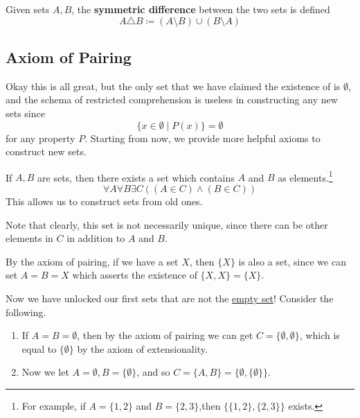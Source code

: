   \begin{definition}
    \label{def:symmetric-difference}
    Given sets $A, B$, the \textbf{symmetric difference} between the two sets is defined 
    \begin{equation}
      A \triangle B \coloneqq (A \setminus B) \cup (B \setminus A)
    \end{equation}
  \end{definition} 

\subsection{Axiom of Pairing}

  Okay this is all great, but the only set that we have claimed the existence of is $\emptyset$, and the schema of restricted comprehension is useless in constructing any new sets since 
  \begin{equation}
    \{x \in \emptyset \mid P(x) \} = \emptyset
  \end{equation}
  for any property $P$. Starting from now, we provide more helpful axioms to construct new sets. 

  \begin{axiom}
    \label{thm:axiom-of-pairing}
    If $A, B$ are sets, then there exists a set which contains $A$ and $B$ as elements.\footnote{For example, if $A = \{1, 2\}$ and $B = \{2, 3\}$,then $\{\{1, 2\}, \{2, 3\}\}$ exists.}
    \begin{equation}
      \forall A \forall B \exists C((A \in C) \land (B \in C))
    \end{equation}
    This allows us to construct sets from old ones. 
  \end{axiom}

  Note that clearly, this set is not necessarily unique, since there can be other elements in $C$ in addition to $A$ and $B$. 

  \begin{theorem}
    \label{thm:nested-sets}
    By the axiom of pairing, if we have a set $X$, then $\{X\}$ is also a set, since we can set $A = B = X$ which asserts the existence of $\{X, X\} = \{X\}$. 
  \end{theorem} 

  \begin{example}
    \label{ex:more-sets}
    Now we have unlocked our first sets that are not the \hyperref[def:empty-set]{empty set}! Consider the following. 
    \begin{enumerate}
      \item If $A = B = \emptyset$, then by the axiom of pairing we can get $C = \{\emptyset, \emptyset\}$, which is equal to $\{\emptyset\}$ by the axiom of extensionality. 
      \item Now we let $A = \emptyset, B = \{\emptyset\}$, and so $C = \{A, B \} = \{\emptyset, \{\emptyset\}\}$. 
    \end{enumerate}
  \end{example}

